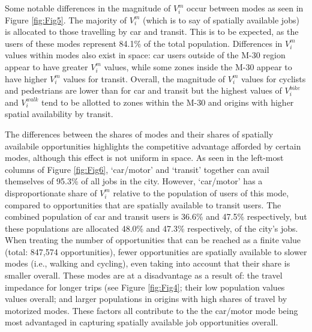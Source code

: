 \documentclass[10pt,letterpaper]{article}
\begin{document}
Some notable differences in the magnitude of \(V_i^m\) occur between
modes as seen in Figure \ref{fig:Fig5}. The majority of \(V_i^m\) (which
is to say of spatially available jobs) is allocated to those travelling
by car and transit. This is to be expected, as the users of these modes
represent 84.1\% of the total population. Differences in \(V_i^m\)
values within modes also exist in space: car users outside of the M-30
region appear to have greater \(V_i^m\) values, while some zones inside
the M-30 appear to have higher \(V_i^m\) values for transit. Overall,
the magnitude of \(V_i^m\) values for cyclists and pedestrians are lower
than for car and transit but the highest values of \(V_i^{bike}\) and
\(V_i^{walk}\) tend to be allotted to zones within the M-30 and origins
with higher spatial availability by transit.

The differences between the shares of modes and their shares of
spatially availabile opportunities highlights the competitive advantage
afforded by certain modes, although this effect is not uniform in space.
As seen in the left-most columns of Figure \ref{fig:Fig6}, `car/motor'
and `transit' together can avail themselves of 95.3\% of all jobs in the
city. However, `car/motor' has a disproportionate share of \(V_i^m\)
relative to the population of users of this mode, compared to
opportunities that are spatially available to transit users. The
combined population of car and transit users is 36.6\% and 47.5\%
respectively, but these populations are allocated 48.0\% and 47.3\%
respectively, of the city's jobs. When treating the number of
opportunities that can be reached as a finite value (total: 847,574
opportunities), fewer opportunities are spatially available to slower
modes (i.e., walking and cycling), even taking into account that their
share is smaller overall. These modes are at a disadvantage as a result
of: the travel impedance for longer trips (see Figure \ref{fig:Fig4};
their low population values values overall; and larger populations in
origins with high shares of travel by motorized modes. These factors all
contribute to the the car/motor mode being most advantaged in capturing
spatially available job opportunities overall.
\end{document}
